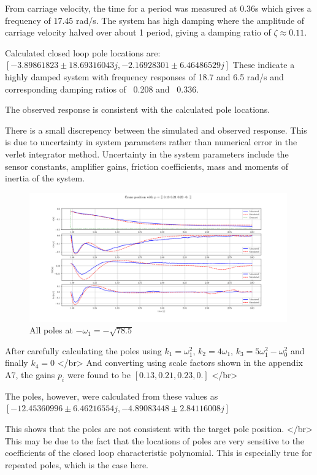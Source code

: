 \documentclass{article}
\begin{document}
From carriage velocity, the time for a period was measured at 0.36s which gives a frequency of 17.45 rad/s.
The system has high damping where the amplitude of carriage velocity halved over about 1 period, giving a damping ratio of $\zeta \approx 0.11$.

Calculated closed loop pole locations are: $[-3.89861823 \pm 18.69316043j, -2.16928301 \pm 6.46486529j]$
These indicate a highly damped system with frequency responses of 18.7 and 6.5 rad/s and corresponding damping ratios of ~0.208 and ~0.336.

The observed response is consistent with the calculated pole locations.

There is a small discrepency between the simulated and observed response. This is due to uncertainty in system parameters rather than numerical error in the verlet integrator method.
Uncertainty in the system parameters include the sensor constants, amplifier gains, friction coefficients, mass and moments of inertia of the system.


\begin{figure}[H]
  \centering
  \includegraphics[width=0.99\textwidth]{figures/3.4a.png}
  \caption{All poles at $-\omega_1 = -\sqrt{78.5}$}
  \label{fig:exp3.4a}
\end{figure}

After carefully calculating the poles using $k_1 = \omega_1^2$, $k_2 = 4\omega_1$, $k_3 = 5\omega_1^2 - \omega_0^2$ and finally $k_4 = 0$ </br>
And converting using scale factors shown in the appendix A7, the gains $p_i$ were found to be $[ 0.13,  0.21,  0.23, 0.  ]$ </br>

The poles, however, were calculated from these values as $[-12.45360996 \pm 6.46216554j, -4.89083448 \pm 2.84116008j]$

This shows that the poles are not consistent with the target pole position. </br>
This may be due to the fact that the locations of poles are very sensitive to the coefficients of the closed loop characteristic polynomial.
This is especially true for repeated poles, which is the case here.
\end{document}
